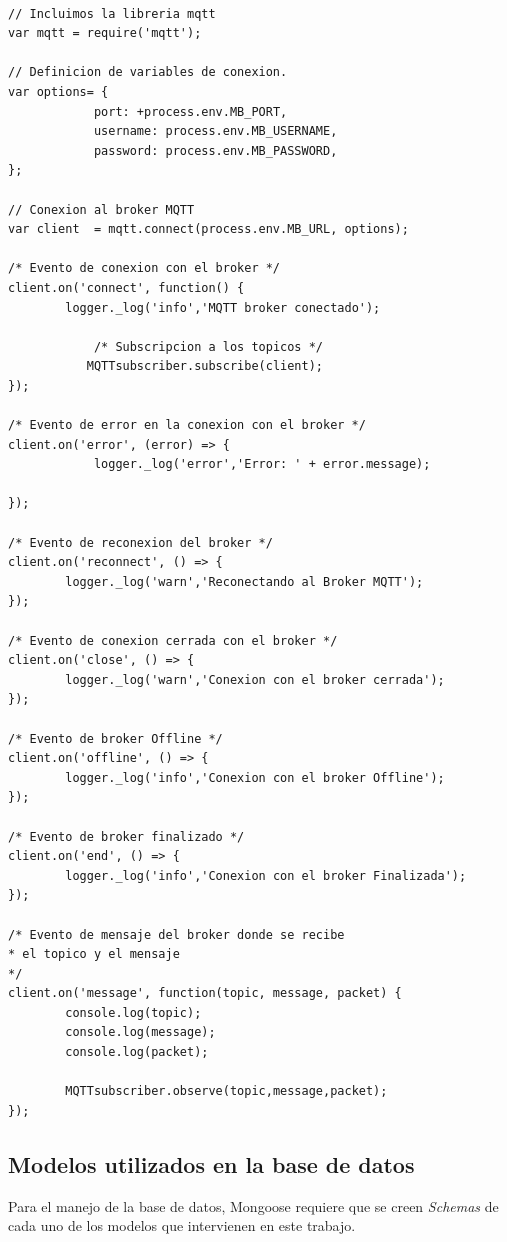 \begin{lstlisting}[label=cod:mqtt-code,caption=Cliente MQTT en el servidor utilizando librería  MQTT.js.] 

// Incluimos la libreria mqtt
var mqtt = require('mqtt');

// Definicion de variables de conexion.
var options= {
            port: +process.env.MB_PORT,
            username: process.env.MB_USERNAME,
            password: process.env.MB_PASSWORD,           
};
   
// Conexion al broker MQTT     
var client  = mqtt.connect(process.env.MB_URL, options);

/* Evento de conexion con el broker */
client.on('connect', function() {
		logger._log('info','MQTT broker conectado');

            /* Subscripcion a los topicos */
           MQTTsubscriber.subscribe(client);
});

/* Evento de error en la conexion con el broker */
client.on('error', (error) => {
        	logger._log('error','Error: ' + error.message);
            
});

/* Evento de reconexion del broker */
client.on('reconnect', () => {
		logger._log('warn','Reconectando al Broker MQTT');
});

/* Evento de conexion cerrada con el broker */
client.on('close', () => {
		logger._log('warn','Conexion con el broker cerrada');
});

/* Evento de broker Offline */
client.on('offline', () => {
		logger._log('info','Conexion con el broker Offline');
});

/* Evento de broker finalizado */
client.on('end', () => {
	 	logger._log('info','Conexion con el broker Finalizada');
});

/* Evento de mensaje del broker donde se recibe 
* el topico y el mensaje 
*/
client.on('message', function(topic, message, packet) {
	 	console.log(topic);
		console.log(message);
	 	console.log(packet);

		MQTTsubscriber.observe(topic,message,packet);
});
\end{lstlisting}


\subsection{Modelos utilizados en la base de datos}

Para el manejo de la base de datos, Mongoose requiere que se creen \textit{Schemas} de cada uno de los modelos que intervienen en este trabajo. 

